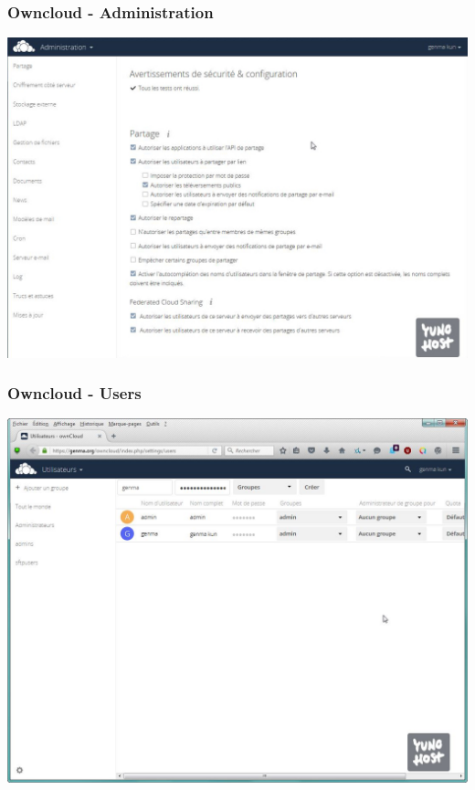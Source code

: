 \documentclass{beamer}
\begin{document}
\begin{frame}
\frametitle{Owncloud - Administration}
\includegraphics[scale=0.3] {./Owncloud/Owncloud_Administration.jpg}
\end{frame}

\begin{frame}
\frametitle{Owncloud - Users}
\includegraphics[scale=0.4] {./Owncloud/Owncloud_Utilisateurs.jpg}
\end{frame}
\end{document}
